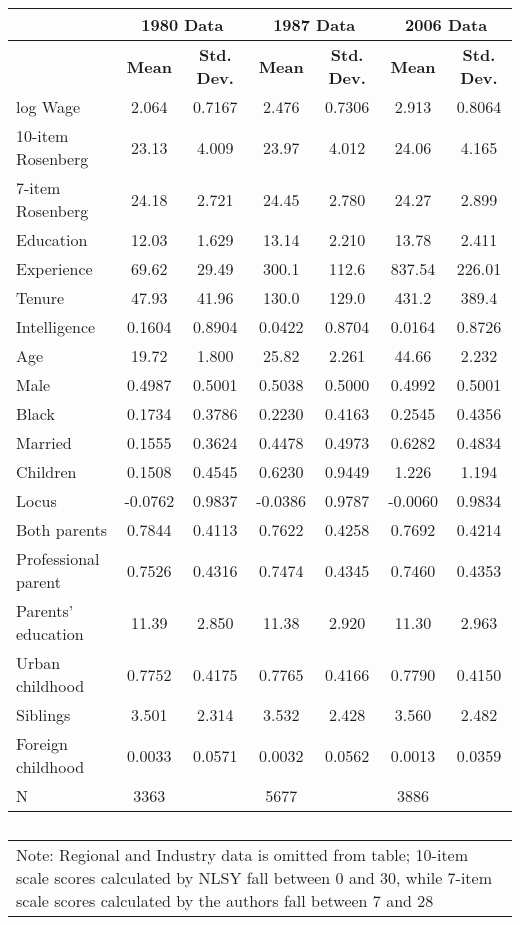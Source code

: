 \documentclass[12pt]{report}
\newcommand{\prbf}[1]{\textbf{#1}}
\begin{document}
\begin{table}
\caption{
\label{tab:stat}}
\vspace{2pt}
\centering\begin{tabular}{l|c|c|c|c|c|c}
\hline
\hline
& \multicolumn{2}{|c|}{1980 Data} & \multicolumn{2}{|c|}{1987 Data} & \multicolumn{2}{|c|}{2006 Data}\\
\hline
& \prbf{Mean} & \prbf{Std. Dev.} & \prbf{Mean} & \prbf{Std. Dev.} & \prbf{Mean} & \prbf{Std. Dev.}\\
\hline
log Wage & 2.064 & 0.7167 & 2.476 & 0.7306 & 2.913 & 0.8064\\
10-item Rosenberg & 23.13 & 4.009 & 23.97 & 4.012 & 24.06 & 4.165\\
7-item Rosenberg & 24.18 & 2.721 & 24.45 & 2.780 & 24.27 & 2.899\\
Education & 12.03 & 1.629 & 13.14 & 2.210 & 13.78 & 2.411\\
Experience & 69.62 & 29.49 & 300.1 & 112.6 & 837.54 & 226.01\\
Tenure & 47.93 & 41.96 & 130.0 & 129.0 & 431.2 & 389.4\\
Intelligence & 0.1604 & 0.8904 & 0.0422 & 0.8704 & 0.0164 & 0.8726\\
Age & 19.72 & 1.800 & 25.82 & 2.261 & 44.66 & 2.232\\
Male & 0.4987 & 0.5001 & 0.5038 & 0.5000 & 0.4992 & 0.5001\\
Black & 0.1734 & 0.3786 & 0.2230 & 0.4163 & 0.2545 & 0.4356\\
Married & 0.1555 & 0.3624 & 0.4478 & 0.4973 & 0.6282 & 0.4834\\
Children & 0.1508 & 0.4545 & 0.6230 & 0.9449 & 1.226 & 1.194\\
Locus & -0.0762 & 0.9837 & -0.0386 & 0.9787 & -0.0060 & 0.9834\\
Both parents & 0.7844 & 0.4113 & 0.7622 & 0.4258 & 0.7692 & 0.4214\\
Professional parent & 0.7526 & 0.4316 & 0.7474 & 0.4345 & 0.7460 & 0.4353\\
Parents' education & 11.39 & 2.850 & 11.38 & 2.920 & 11.30 & 2.963\\
Urban childhood & 0.7752 & 0.4175 & 0.7765 & 0.4166 & 0.7790 & 0.4150\\
Siblings & 3.501 & 2.314 & 3.532 & 2.428 & 3.560 & 2.482\\
Foreign childhood & 0.0033 & 0.0571 & 0.0032 & 0.0562 & 0.0013 & 0.0359\\
\hline
N & 3363 & & 5677 & & 3886 & \\
\hline
\hline
\end{tabular}
\begin{tabular}{p{6.25in}}\footnotesize{
Note: Regional and Industry data is omitted from table; 10-item scale scores calculated by NLSY fall between 0 and 30, while 7-item scale scores calculated by the authors fall between 7 and 28}\\
\end{tabular}
\end{table}
\end{document}
